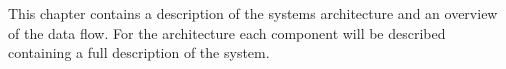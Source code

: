 This chapter contains a description of the systems architecture and an overview of the data flow.
For the architecture each component will be described containing a full description of the system.
